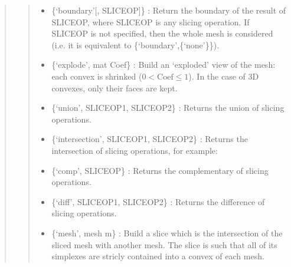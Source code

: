 \documentclass[a4paper,11pt,english]{sphinxmanual}
\begin{document}
\begin{quote}
\begin{quote}
\begin{itemize}
\item {} 
\{‘boundary’{[}, SLICEOP{]}\} :
Return the boundary of the result of SLICEOP, where SLICEOP is any
slicing operation. If SLICEOP is not specified, then the whole mesh is
considered (i.e. it is equivalent to \{‘boundary’,\{‘none’\}\}).

\item {} 
\{‘explode’, mat Coef\} :
Build an ‘exploded’ view of the mesh: each convex is shrinked (\(0 <
\text{Coef} \leq 1\)). In the case of 3D convexes, only their faces are kept.

\item {} 
\{‘union’, SLICEOP1, SLICEOP2\} :
Returns the union of slicing operations.

\item {} 
\{‘intersection’, SLICEOP1, SLICEOP2\} :
Returns the intersection of slicing operations, for example:

\begin{sphinxVerbatim}[commandchars=\\\{\}]
  
\end{sphinxVerbatim}

\item {} 
\{‘comp’, SLICEOP\} :
Returns the complementary of slicing operations.

\item {} 
\{‘diff’, SLICEOP1, SLICEOP2\} :
Returns the difference of slicing operations.

\item {} 
\{‘mesh’, mesh m\} :
Build a slice which is the intersection of the sliced mesh with another
mesh. The slice is such that all of its simplexes are stricly contained
into a convex of each mesh.

\end{itemize}
\end{quote}

\begin{quote}


\end{quote}
\end{quote}
\end{document}
